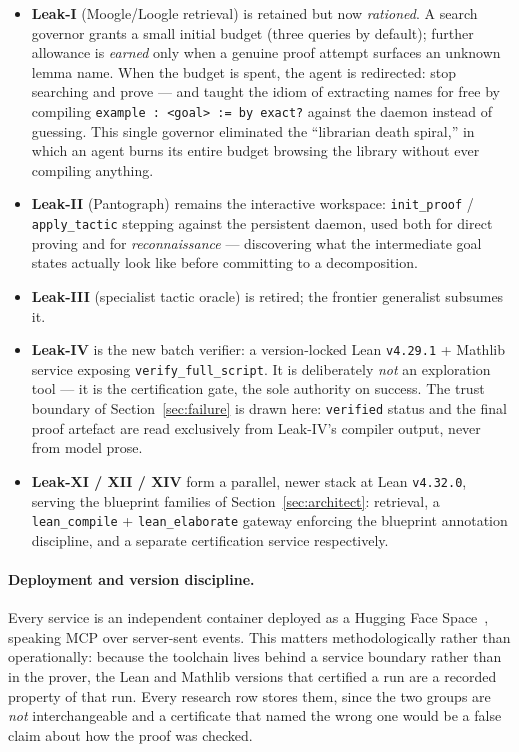 \documentclass[12pt, a4paper]{article}
\begin{document}
\begin{itemize}[leftmargin=*]
  \item \textbf{Leak-I} (Moogle/Loogle retrieval) is retained but now
    \emph{rationed}. A search governor grants a small initial budget
    (three queries by default); further allowance is \emph{earned} only when
    a genuine proof attempt surfaces an unknown lemma name. When the budget
    is spent, the agent is redirected: stop searching and prove --- and
    taught the idiom of extracting names for free by compiling
    \texttt{example : <goal> := by exact?} against the daemon instead of
    guessing. This single governor eliminated the ``librarian death
    spiral,'' in which an agent burns its entire budget browsing the library
    without ever compiling anything.
  \item \textbf{Leak-II} (Pantograph) remains the interactive workspace:
    \texttt{init\_proof} / \texttt{apply\_tactic} stepping against the
    persistent daemon, used both for direct proving and for
    \emph{reconnaissance} --- discovering what the intermediate goal states
    actually look like before committing to a decomposition.
  \item \textbf{Leak-III} (specialist tactic oracle) is retired; the
    frontier generalist subsumes it.
  \item \textbf{Leak-IV} is the new batch verifier: a version-locked Lean
    \texttt{v4.29.1} + Mathlib service exposing \texttt{verify\_full\_script}.
    It is deliberately \emph{not} an exploration tool --- it is the
    certification gate, the sole authority on success. The trust boundary of
    Section~\ref{sec:failure} is drawn here: \texttt{verified} status and the
    final proof artefact are read exclusively from Leak-IV's compiler output,
    never from model prose.
  \item \textbf{Leak-XI / XII / XIV} form a parallel, newer stack at Lean
    \texttt{v4.32.0}, serving the blueprint families of
    Section~\ref{sec:architect}: retrieval, a \texttt{lean\_compile} +
    \texttt{lean\_elaborate} gateway enforcing the blueprint annotation
    discipline, and a separate certification service respectively.
\end{itemize}

\paragraph{Deployment and version discipline.} Every service is an
independent container deployed as a Hugging Face Space~\cite{hfspaces},
speaking MCP over server-sent events. This matters methodologically rather
than operationally: because the toolchain lives behind a service boundary
rather than in the prover, the Lean and Mathlib versions that certified a
run are a recorded property of that run. Every research row stores them,
since the two groups are \emph{not} interchangeable and a certificate that
named the wrong one would be a false claim about how the proof was checked.
\end{document}

